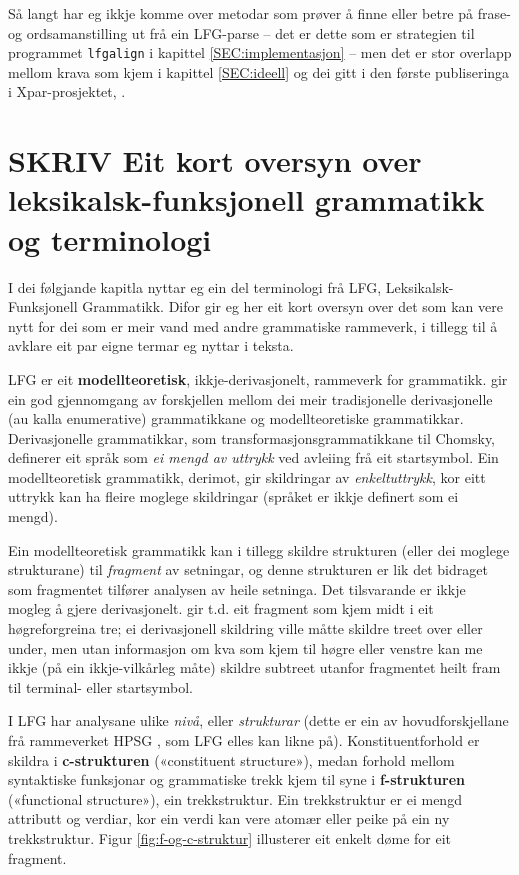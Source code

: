 \documentclass[11pt,a4paper,oneside,draft]{book}
\begin{document}
Så langt har eg ikkje komme over metodar som prøver å finne eller
betre på frase- og ordsamanstilling ut frå ein LFG-parse -- det er
dette som er strategien til programmet \texttt{lfgalign} i kapittel
\ref{SEC:implementasjon} -- men det er stor overlapp mellom krava som
kjem i kapittel \ref{SEC:ideell} og dei gitt i den første publiseringa
i Xpar-prosjektet, \citet{dyvik2009lmp}.

\section{\textbf{SKRIV} Eit kort oversyn over leksikalsk-funksjonell grammatikk og terminologi}
\label{sec-2.2}

 \label{SEC:omgrepsavklaring}

 I dei følgjande kapitla nyttar eg ein del terminologi frå LFG,
 Leksikalsk-Funksjonell Grammatikk. Difor gir eg her eit kort oversyn
 over det som kan vere nytt for dei som er meir vand med andre
 grammatiske rammeverk, i tillegg til å avklare eit par eigne termar
 eg nyttar i teksta.

 LFG er eit \textbf{modellteoretisk}, ikkje-derivasjonelt, rammeverk for
 grammatikk.  \citet{pullum2001dbm} gir ein god gjennomgang av
 forskjellen mellom dei meir tradisjonelle derivasjonelle (au kalla
 enumerative) grammatikkane og modellteoretiske
 grammatikkar. Derivasjonelle grammatikkar, som
 transformasjonsgrammatikkane til Chomsky, definerer eit språk som \emph{ei  mengd av uttrykk} ved avleiing frå eit startsymbol. Ein
 modellteoretisk grammatikk, derimot, gir skildringar av
 \emph{enkeltuttrykk}, kor eitt uttrykk kan ha fleire moglege skildringar
 (språket er ikkje definert som ei mengd).

 Ein modellteoretisk grammatikk kan i tillegg skildre strukturen
 (eller dei moglege strukturane) til \emph{fragment} av setningar, og denne
 strukturen er lik det bidraget som fragmentet tilfører analysen av
 heile setninga. Det tilsvarande er ikkje mogleg å gjere
 derivasjonelt. \citet[s.~32--33]{pullum2001dbm} gir t.d. eit fragment
 som kjem midt i eit høgreforgreina tre; ei derivasjonell skildring
 ville måtte skildre treet over eller under, men utan informasjon om
 kva som kjem til høgre eller venstre kan me ikkje (på ein
 ikkje-vilkårleg måte) skildre subtreet utanfor fragmentet heilt fram
 til terminal- eller startsymbol.

 I LFG har analysane ulike \emph{nivå}, eller \emph{strukturar} (dette er ein av
 hovudforskjellane frå rammeverket HPSG \citep{swb-hpsg}, som LFG
 elles kan likne på). Konstituentforhold er skildra i \textbf{c-strukturen}
 («constituent structure»), medan forhold mellom syntaktiske
 funksjonar og grammatiske trekk kjem til syne i \textbf{f-strukturen}
 («functional structure»), ein trekkstruktur. Ein trekkstruktur er ei
 mengd attributt og verdiar, kor ein verdi kan vere atomær eller peike
 på ein ny trekkstruktur.  Figur \ref{fig:f-og-c-struktur} illusterer
 eit enkelt døme for eit fragment.
\end{document}

